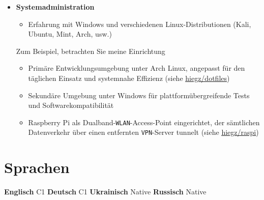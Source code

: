 \documentclass[]{article}
\begin{document}
\begin{minipage}[t]{0.49\linewidth}
    \begin{itemize}[leftmargin=0.15in, rightmargin=0.15in, label={}]
        \item {\large\bfseries Systemadministration}

            \begin{itemize}
                \item Erfahrung mit Windows und verschiedenen Linux-Distributionen (Kali, Ubuntu, Mint, Arch, usw.)
            \end{itemize}

            \hspace{5pt}
            Zum Beispiel, betrachten Sie meine Einrichtung

            \begin{itemize}
                \item Primäre Entwicklungsumgebung unter Arch Linux, angepasst für den täglichen Einsatz und systemnahe Effizienz
                    (siehe \href{https://github.com/hiegz/dotfiles}{\ttfamily \underline{hiegz/dotfiles}})
                \item Sekundäre Umgebung unter Windows für plattformübergreifende Tests und Softwarekompatibilität
                \item Raspberry Pi als Dualband-\verb|WLAN|-Access-Point eingerichtet,
                    der sämtlichen Datenverkehr über einen entfernten \verb|VPN|-Server tunnelt
                    (siehe \href{https://github.com/hiegz/raspi}{\ttfamily \underline{hiegz/raspi}})
            \end{itemize}
    \end{itemize}
\end{minipage}

\vspace{5pt}
\section{Sprachen}

\hspace{0.15in}
\textbf{Englisch} \: C1 \hspace{20pt} \textbf{Deutsch} \: C1 \hspace{20pt} \textbf{Ukrainisch} \: Native \hspace{20pt} \textbf{Russisch} \: Native
\end{document}
